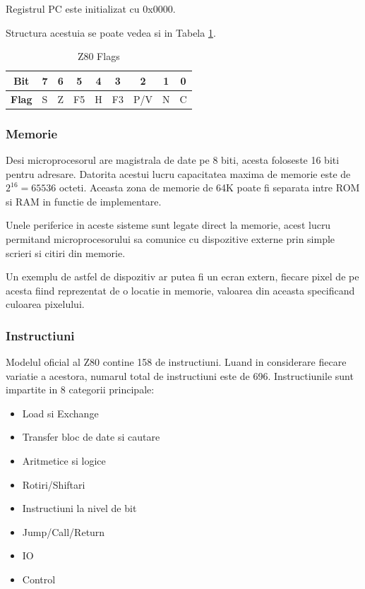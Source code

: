 \documentclass[titlepage,12pt]{article}
\begin{document}
Registrul PC este initializat cu 0x0000.

Structura acestuia se poate vedea si in Tabela \cref{tab:z80flags}.
\begin{table}[h]
\centering
\begin{tabular}{|c|c|c|c|c|c|c|c|c|}
\hline
\textbf{Bit} & 7 & 6 & 5 & 4 & 3 & 2 & 1 & 0 \\
\hline
\textbf{Flag} & S & Z & F5 & H & F3 & P/V & N & C \\
\hline
\end{tabular}
\caption{Z80 Flags}
\label{tab:z80flags}
\end{table}

\subsubsection{Memorie}

Desi microprocesorul are magistrala de date pe 8 biti, acesta foloseste 16 biti pentru adresare. Datorita acestui lucru capacitatea maxima de memorie este de \(2^{16}=65536\) octeti. Aceasta zona de memorie de 64K poate fi separata intre \ac {ROM} si \ac {RAM} in functie de implementare.

Unele periferice in aceste sisteme sunt legate direct la memorie, acest lucru permitand microprocesorului sa comunice cu dispozitive externe prin simple scrieri si citiri din memorie.

Un exemplu de astfel de dispozitiv ar putea fi un ecran extern, fiecare pixel de pe acesta fiind reprezentat de o locatie in memorie, valoarea din aceasta specificand culoarea pixelului.

\subsubsection{Instructiuni}

Modelul oficial al \ac {Z80} contine 158 de instructiuni. Luand in considerare fiecare variatie a acestora, numarul total de instructiuni este de 696.
Instructiunile sunt impartite in 8 categorii principale:
\begin{itemize}
\item Load si Exchange
\item Transfer bloc de date si cautare
\item Aritmetice si logice
\item Rotiri/Shiftari
\item Instructiuni la nivel de bit
\item Jump/Call/Return
\item \ac {IO}
\item Control
\end{itemize}
\end{document}
